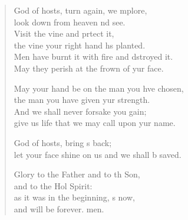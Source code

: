 \begin{verse}
\begin{patverse}
God of hosts, turn again, we \pointup{\i}mplore,\Med\\
look down from heaven nd see.\\
Visit the vine and prtect it,\Med\\
the vine your right hand hs planted.\\
Men have burnt it with fire and dstroyed it.\Med\\
May they perish at the frown of yur face.

May your hand be on the man you hve chosen,\Med\\
the man you have given yur strength.\\
And we shall never forsake you gain;\Med\\
give us life that we may call upon yur name.

God of hosts, bring s back;\Med\\
let your face shine on us and we shall b saved.

Glory to the Father and to th Son,\Med\\
and to the Hol Spirit:\\
as it was in the beginning, \pointup{\i}s now,\Med\\
and will be forever. men.
  \end{patverse}
\end{verse}
